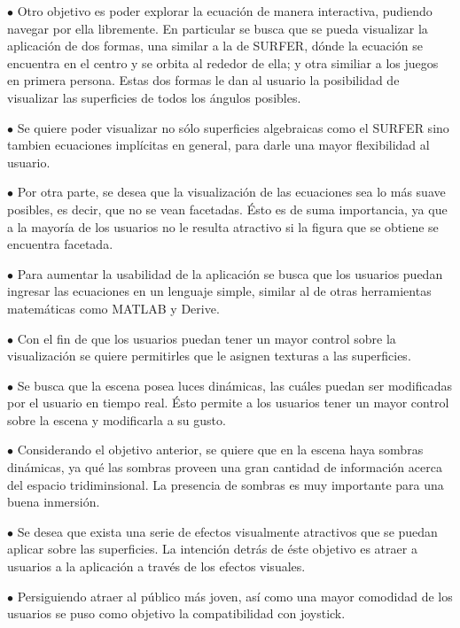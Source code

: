 \documentclass[12pt]{article}
\begin{document}
$\bullet$ Otro objetivo es poder explorar la ecuación de manera interactiva, pudiendo navegar por ella libremente. En particular se busca que se pueda visualizar la aplicación de dos formas, una similar a la de SURFER, dónde la ecuación se encuentra en el centro y se orbita al rededor de ella; y otra similiar a los juegos en primera persona. Estas dos formas le dan al usuario la posibilidad de visualizar las superficies de todos los ángulos posibles.

$\bullet$ Se quiere poder visualizar no sólo superficies algebraicas como el SURFER sino tambien ecuaciones implícitas en general, para darle una mayor flexibilidad al usuario.

$\bullet$ Por otra parte, se desea que la visualización de las ecuaciones sea lo más suave posibles, es decir, que no se vean facetadas. Ésto es de suma importancia, ya que a la mayoría de los usuarios no le resulta atractivo si la figura que se obtiene se encuentra facetada.

$\bullet$ Para aumentar la usabilidad de la aplicación se busca que los usuarios puedan ingresar las ecuaciones en un lenguaje simple, similar al de otras herramientas matemáticas como MATLAB y Derive.

$\bullet$ Con el fin de que los usuarios puedan tener un mayor control sobre la visualización se quiere permitirles que le asignen texturas a las superficies. 

$\bullet$ Se busca que la escena posea  luces dinámicas, las cuáles puedan ser modificadas por el usuario en tiempo real. Ésto permite a los usuarios tener un mayor control sobre la escena y modificarla a su gusto.

$\bullet$ Considerando el objetivo anterior, se quiere que en la escena haya sombras dinámicas, ya qué las sombras proveen una gran cantidad de información acerca del espacio tridiminsional. La presencia de sombras es muy importante para una buena inmersión.

$\bullet$ Se desea que exista una serie de efectos visualmente atractivos que se puedan aplicar sobre las superficies. La intención detrás de éste objetivo es atraer a usuarios a la aplicación a través de los efectos visuales.

$\bullet$ Persiguiendo atraer al público más joven, así como una mayor comodidad de los usuarios se puso como objetivo la compatibilidad con joystick.
\end{document}

